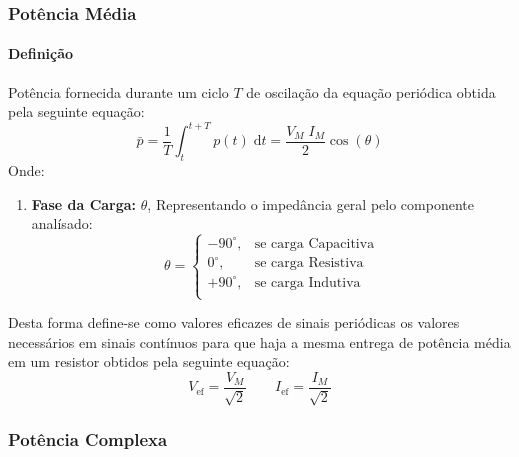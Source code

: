 \documentclass{article}
\begin{document}
            \subsubsection{Potência Média}
                \paragraph{Definição}Potência fornecida durante um ciclo $T$ de oscilação da equação periódica obtida pela seguinte equação:
                    \begin{equation}
                        \bar{p} = 
                        \frac{1}{T} \int_{t}^{t+T} p(t)\;\text{d}t = 
                        \boxed{
                            \frac{V_{M}\;I_{M}}{2} \cos(\theta)
                        }
                    \end{equation}
                Onde:
                    \begin{enumerate}
                        \item \textbf{Fase da Carga:} $\theta$, Representando o impedância geral pelo componente analísado:
                            \begin{equation*}
                                \theta = 
                                \begin{cases}
                                    -90^{\circ}, & \text{se carga Capacitiva}\\
                                      0^{\circ}, & \text{se carga Resistiva}\\
                                    +90^{\circ}, & \text{se carga Indutiva}\\
                                \end{cases}
                            \end{equation*}
                    \end{enumerate}
                Desta forma define-se como valores eficazes de sinais periódicas os valores necessários em sinais contínuos para que haja a mesma entrega de potência média em um resistor obtidos pela seguinte equação:
                    \begin{equation}
                        \boxed{V_{\text{ef}} = \frac{V_{M}}{\sqrt{2}}}
                        \qquad
                        \boxed{I_{\text{ef}} = \frac{I_{M}}{\sqrt{2}}}
                    \end{equation}

            \subsubsection{Potência Complexa}
\end{document}
